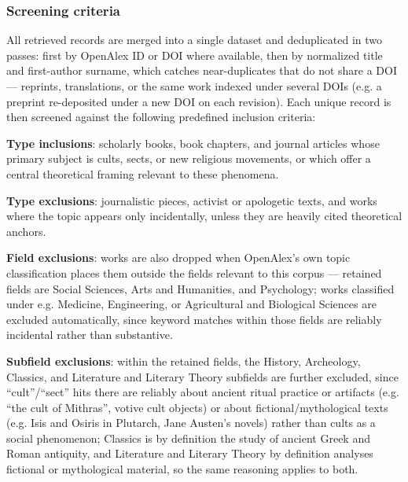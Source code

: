 \subsubsection{Screening criteria}
All retrieved records are merged into a single dataset and deduplicated in two passes: first by OpenAlex ID or DOI where available, then by normalized title and first-author surname, which catches near-duplicates that do not share a DOI — reprints, translations, or the same work indexed under several DOIs (e.g. a preprint re-deposited under a new DOI on each revision). Each unique record is then screened against the following predefined inclusion criteria:

\textbf{Type inclusions}: scholarly books, book chapters, and journal articles whose primary subject is cults, sects, or new religious movements, or which offer a central theoretical framing relevant to these phenomena.

\textbf{Type exclusions}: journalistic pieces, activist or apologetic texts, and works where the topic appears only incidentally, unless they are heavily cited theoretical anchors.

\textbf{Field exclusions}: works are also dropped when OpenAlex's own topic classification places them outside the fields relevant to this corpus — retained fields are Social Sciences, Arts and Humanities, and Psychology; works classified under e.g. Medicine, Engineering, or Agricultural and Biological Sciences are excluded automatically, since keyword matches within those fields are reliably incidental rather than substantive.

\textbf{Subfield exclusions}: within the retained fields, the History, Archeology, Classics, and Literature and Literary Theory subfields are further excluded, since \enquote{cult}/\enquote{sect} hits there are reliably about ancient ritual practice or artifacts (e.g. \enquote{the cult of Mithras}, votive cult objects) or about fictional/mythological texts (e.g. Isis and Osiris in Plutarch, Jane Austen's novels) rather than cults as a social phenomenon; Classics is by definition the study of ancient Greek and Roman antiquity, and Literature and Literary Theory by definition analyses fictional or mythological material, so the same reasoning applies to both.


